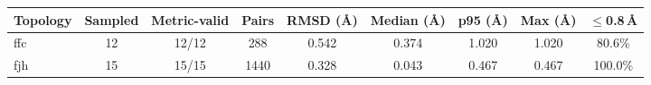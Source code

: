 \begin{tabular}{lcccccccc}
\toprule
Topology & Sampled & Metric-valid & Pairs & RMSD (\AA) & Median (\AA) & p95 (\AA) & Max (\AA) & $\le$0.8\,\AA \\
\midrule
ffc & 12 & 12/12 & 288 & 0.542 & 0.374 & 1.020 & 1.020 & 80.6\% \\
fjh & 15 & 15/15 & 1440 & 0.328 & 0.043 & 0.467 & 0.467 & 100.0\% \\
\bottomrule
\end{tabular}
